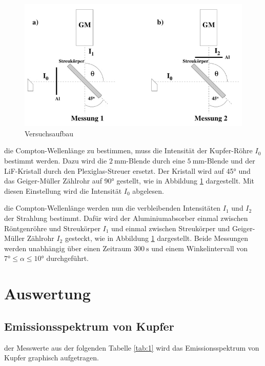     \begin{figure}
        \centering
        \includegraphics[width=0.75\linewidth]{./images/Aufbau2.jpg}
        \caption{Versuchsaufbau \cite{V603}}
        \label{fig:1b}
    \end{figure}

    \justifying die Compton-Wellenlänge zu bestimmen, muss die Intensität der Kupfer-Röhre $I_0$ bestimmt werden. Dazu wird die $\SI{2}{\milli\meter}$-Blende
    durch eine $\SI{5}{\milli\meter}$-Blende und der LiF-Kristall durch den Plexiglas-Streuer ersetzt. Der Kristall wird auf 45° und das Geiger-Müller Zählrohr auf 90° gestellt, 
    wie in Abbildung \ref{fig:1b} dargestellt. Mit diesen Einstellung wird die Intensität $I_0$ abgelesen.

    \justifying die Compton-Wellenlänge werden nun die verbleibenden Intensitäten $I_1$ und $I_2$ der Strahlung bestimmt. Dafür wird der Aluminiumabsorber 
    einmal zwischen Röntgenröhre und Streukörper $I_1$ und einmal zwischen Streukörper und Geiger-Müller Zählrohr $I_2$ gesteckt, wie in Abbildung \ref{fig:1b} dargestellt. 
    Beide Messungen werden unabhängig über einen Zeitraum $\SI{300}{\second}$ und einem Winkelintervall von $7° \leq \alpha \leq 10°$ durchgeführt. 


\newpage
\section{Auswertung}

    \subsection{Emissionsspektrum von Kupfer}

    \justifying der Messwerte aus der folgenden Tabelle \ref{tab:1} wird das Emissionsspektrum von Kupfer graphisch aufgetragen.

    

